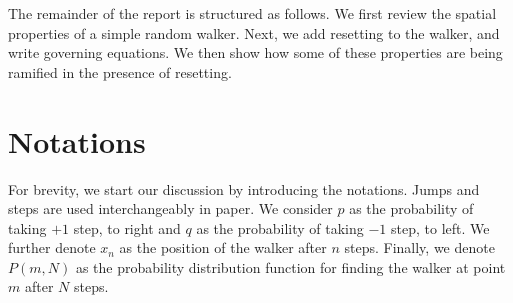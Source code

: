 \documentclass[showpacs,amsmath,amssymb,aps,pre,twocolumn]{revtex4-1}
\begin{document}
{The remainder of the report is structured as follows. We first review the spatial properties of a simple random walker. Next, we add resetting to the walker, and write governing equations. We then show how some of these properties are being ramified in the presence of resetting.}


 
 
 
 
\section{Notations}
For brevity, we start our discussion by introducing the notations. Jumps and steps are used interchangeably in paper. We consider
$p$ as the probability of taking $+1$ step, to right and
$q$ as the probability of taking $-1$ step, to left. We further denote $x_n$ as the position of the walker after $n$ steps. Finally, we denote 
$P(m,N)$ as the probability distribution function for finding the walker at point $m$ after $N$ steps.
\end{document}
